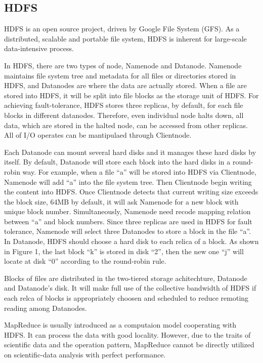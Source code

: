 \documentclass[preprint,12pt]{elsarticle}
\begin{document}
\subsection{HDFS}
HDFS is an open source project, driven by Google File System (GFS). As a distributed, scalable and portable file system, HDFS is
inherent for large-scale data-intensive process. \par
In HDFS, there are two types of node, Namenode and Datanode. Namenode maintains file system tree and metadata for all files or
directories stored in HDFS, and Datanodes are where the data are actually stored. When a file are stored into HDFS, it will be
split into file blocks as the storage unit of HDFS. For achieving fault-tolerance, HDFS stores three replicas, by default, for each
file blocks in different datanodes. Therefore, even individual node halts down, all data, which are stored in the halted node, can
be accessed from other replicas. All of I/O operates can be mantipulaed through Clientnode. \par
Each Datanode can mount several hard disks and it manages these hard disks by itself. By default, Datanode will store each block
into the hard disks in a round-robin way. For example, when a file ``a'' will be stored into HDFS via Clientnode, Namenode will add
``a'' into the file system tree. Then Clientnode begin writing the content into HDFS. Once Clientnode detects that current writing
size exceeds the block size, 64MB by default, it will ask Namenode for a new block with unique block number. Simultaneously,
Namenode need recode mapping relation between ``a'' and block numbers. Since three replicas are used in HDFS for fault tolerance,
Namenode will select three Datanodes to store a block in the file ``a''. In Datanode, HDFS should choose a hard disk to each relica 
of a block. As shown in Figure 1, the last block ``k'' is stored in disk ``2'', then the new one ``j'' will locate at disk ``0'' 
according to the round-robin rule. \par
Blocks of files are distributed in the two-tiered storage achitechture, Datanode and Datanode's disk. It will make full use of the
collective bandwidth of HDFS if each relca of blocks is appropriately choosen and scheduled to reduce remoting reading among
Datanodes. \par
MapReduce is usually introduced as a computaion model cooperating with HDFS. It can process the data with good locality.
However, due to the traits of scientific data and the operation pattern, MapReduce cannot be directly utilized on scientific-data
analysis with perfect performance.
\end{document}
